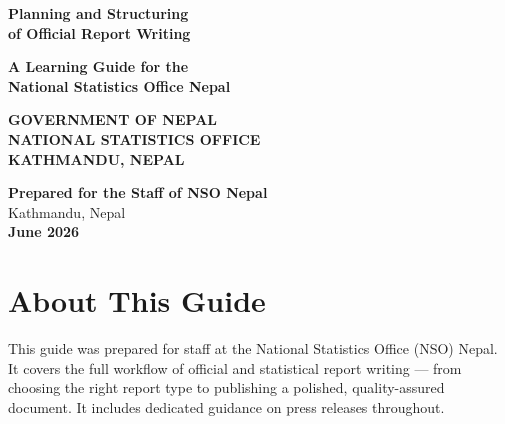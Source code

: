 \documentclass[11pt,a4paper,oneside]{book}
\begin{document}
\frontmatter

\begin{titlepage}
    \centering
    \vspace*{2cm}
    {\Huge\bfseries\color{nsoblue} Planning and Structuring\\ of Official Report Writing\par}
    \vspace{1.5cm}
    {\Large\bfseries\color{nsored} A Learning Guide for the\\ National Statistics Office Nepal\par}
    \vspace{3.5cm}
    
    \begin{tcolorbox}[colback=white, colframe=nsoblue, width=7.5cm, height=3.5cm, arc=2mm, halign=center, valign=center, boxrule=2pt]
        \centering\bfseries\color{nsoblue}
        \large GOVERNMENT OF NEPAL\\
        \vspace{0.3cm}
        \Large NATIONAL STATISTICS OFFICE\\
        \vspace{0.2cm}
        \small KATHMANDU, NEPAL
    \end{tcolorbox}
    
    \vfill
    {\large\bfseries\color{nsoblue} Prepared for the Staff of NSO Nepal}\\[0.5em]
    {\large\color{darkgray} Kathmandu, Nepal}\\[1.5em]
    {\large\bfseries\color{nsored} June 2026}
\end{titlepage}

\chapter*{About This Guide}

This guide was prepared for staff at the National Statistics Office (NSO) Nepal. It covers the full workflow of official and statistical report writing --- from choosing the right report type to publishing a polished, quality-assured document. It includes dedicated guidance on press releases throughout.
\end{document}

